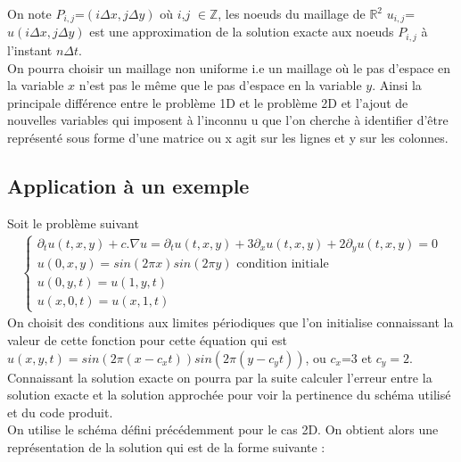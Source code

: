 \documentclass[12pt]{article}
\begin{document}
On note $P_{i,j}$=$(i \Delta x,j \Delta y)$ où $i$,$j$ $\in\mathbb{Z}$, les noeuds du maillage de $\mathbb{R}^2$  $u_{i,j}$=$u(i \Delta x,j \Delta y)$ est une approximation de la solution exacte aux noeuds $P_{i,j}$ à l'instant $n\Delta t$.
\\On pourra choisir un maillage non uniforme i.e un maillage où le pas d'espace en la variable $x$ n'est pas le même que le pas d'espace en la variable $y$.
Ainsi la principale différence entre le problème 1D et le problème 2D et l'ajout de nouvelles variables qui imposent à l'inconnu u que l'on cherche à identifier d'être représenté sous forme d'une matrice ou x agit sur les lignes et y sur les colonnes.
\newpage
\subsection{Application à un exemple}
Soit le problème suivant
\begin{eqnarray*}
      \left\{
        \begin{array}{llll}
            \partial_tu(t,x,y)+c.\nabla u=\partial_tu(t,x,y) +3\partial_xu(t,x,y)+2\partial_yu(t,x,y)=0
            \\ u(0,x,y)=sin(2\pi x)sin(2\pi y) \text{ condition initiale}
            \\u(0,y,t)=u(1,y,t)
            \\u(x,0,t)=u(x,1,t)
        \end{array}
    \right .
\end{eqnarray*}
On choisit des conditions aux limites périodiques que l'on initialise connaissant la valeur de cette fonction pour cette équation qui est $u(x,y,t)=sin(2\pi (x-c_xt))sin(2\pi(y-c_yt))$, ou $c_x$=3 et $c_y=2$.
Connaissant la solution exacte on pourra par la suite calculer l'erreur entre la solution exacte et la solution approchée pour voir la pertinence du schéma utilisé et du code produit.
\\On utilise le schéma défini précédemment pour le cas 2D. On obtient alors une représentation de la solution qui est de la forme suivante :
\end{document}
